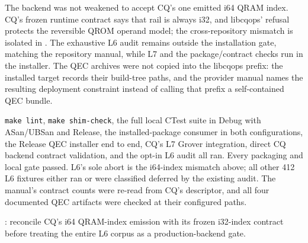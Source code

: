 The backend was not weakened to accept CQ's one emitted i64 QRAM index.  CQ's
frozen runtime contract says that rail is always i32, and libcqops' refusal protects
the reversible QROM operand model; the cross-repository mismatch is isolated in
.  The exhaustive L6 audit remains outside the installation gate, matching
the repository manual, while L7 and the package/contract checks run in the installer.
The QEC archives were not copied into the libcqops prefix: the installed target
records their build-tree paths, and the provider manual names the resulting
deployment constraint instead of calling that prefix a self-contained QEC bundle.

\texttt{make lint}, \texttt{make shim-check}, the full local CTest suite in Debug
with ASan/UBSan and Release, the installed-package consumer in both configurations,
the Release QEC installer end to end, CQ's L7 Grover integration, direct CQ backend
contract validation, and the opt-in L6 audit all ran.  Every packaging and local
gate passed.  L6's sole abort is the i64-index mismatch above; all other 412 L6
fixtures either ran or were classified deferred by the existing audit.  The manual's
contract counts were re-read from CQ's descriptor, and all four documented QEC
artifacts were checked at their configured paths.

: reconcile CQ's i64 QRAM-index emission with its frozen i32-index
contract before treating the entire L6 corpus as a production-backend gate.
